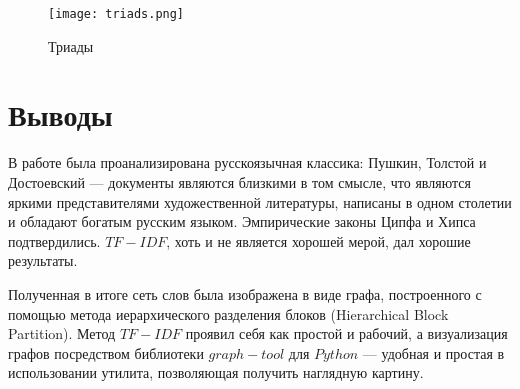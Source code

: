 \begin{sidewaystable}
  \centering
  \caption{Матрица весов графа биграмм и триад}
  \label{fig:matrix:triads:table}
\end{sidewaystable}

\begin{figure}[h]
  \centering
  \texttt{[image: triads.png]}
  \caption{Триады}
  \label{fig:triads:graph}
\end{figure}

\clearpage

\chapter*{Выводы}

В работе была проанализирована русскоязычная классика:
Пушкин, Толстой и Достоевский --- документы являются близкими в том смысле,
что являются яркими представителями художественной литературы,
написаны в одном столетии и обладают богатым русским языком.
Эмпирические законы Ципфа и Хипса подтвердились.
$TF-IDF$, хоть и не является хорошей мерой,
дал хорошие результаты.

Полученная в итоге сеть слов была изображена в виде графа, построенного
с помощью метода иерархического разделения блоков (Hierarchical Block Partition).
Метод $TF-IDF$ проявил себя как простой и рабочий,
а визуализация графов посредством библиотеки $graph-tool$ для $Python$ ---
удобная и простая в использовании утилита, позволяющая получить наглядную
картину.

\clearpage
{}
{}
\renewcommand\bibname{Список литературы}



